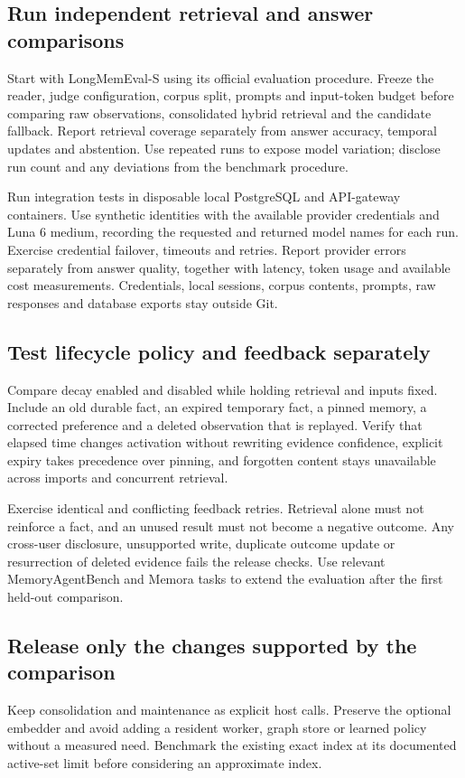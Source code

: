 \documentclass[11pt]{article}
\begin{document}
\subsection{Run independent retrieval and answer comparisons}
Start with LongMemEval-S using its official evaluation procedure. Freeze the reader, judge configuration, corpus split, prompts and input-token budget before comparing raw observations, consolidated hybrid retrieval and the candidate fallback. Report retrieval coverage separately from answer accuracy, temporal updates and abstention. Use repeated runs to expose model variation; disclose run count and any deviations from the benchmark procedure.

Run integration tests in disposable local PostgreSQL and API-gateway containers. Use synthetic identities with the available provider credentials and Luna 6 medium, recording the requested and returned model names for each run. Exercise credential failover, timeouts and retries. Report provider errors separately from answer quality, together with latency, token usage and available cost measurements. Credentials, local sessions, corpus contents, prompts, raw responses and database exports stay outside Git.

\subsection{Test lifecycle policy and feedback separately}
Compare decay enabled and disabled while holding retrieval and inputs fixed. Include an old durable fact, an expired temporary fact, a pinned memory, a corrected preference and a deleted observation that is replayed. Verify that elapsed time changes activation without rewriting evidence confidence, explicit expiry takes precedence over pinning, and forgotten content stays unavailable across imports and concurrent retrieval.

Exercise identical and conflicting feedback retries. Retrieval alone must not reinforce a fact, and an unused result must not become a negative outcome. Any cross-user disclosure, unsupported write, duplicate outcome update or resurrection of deleted evidence fails the release checks. Use relevant MemoryAgentBench and Memora tasks to extend the evaluation after the first held-out comparison.

\subsection{Release only the changes supported by the comparison}
Keep consolidation and maintenance as explicit host calls. Preserve the optional embedder and avoid adding a resident worker, graph store or learned policy without a measured need. Benchmark the existing exact index at its documented active-set limit before considering an approximate index.
\end{document}
